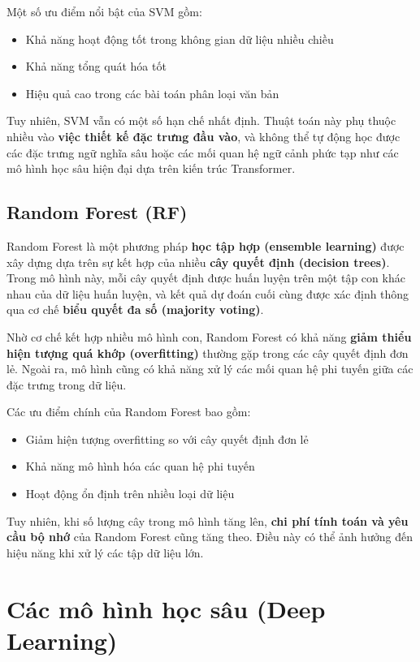 \documentclass[14pt, a4paper]{report}
\begin{document}
Một số ưu điểm nổi bật của SVM gồm:

\begin{itemize}
    \item Khả năng hoạt động tốt trong không gian dữ liệu nhiều chiều
    \item Khả năng tổng quát hóa tốt
    \item Hiệu quả cao trong các bài toán phân loại văn bản
\end{itemize}

Tuy nhiên, SVM vẫn có một số hạn chế nhất định. Thuật toán này phụ thuộc nhiều vào \textbf{việc thiết kế đặc trưng đầu vào}, và không thể tự động học được các đặc trưng ngữ nghĩa sâu hoặc các mối quan hệ ngữ cảnh phức tạp như các mô hình học sâu hiện đại dựa trên kiến trúc Transformer.

\subsection{Random Forest (RF)}

Random Forest là một phương pháp \textbf{học tập hợp (ensemble learning)} được xây dựng dựa trên sự kết hợp của nhiều \textbf{cây quyết định (decision trees)}. Trong mô hình này, mỗi cây quyết định được huấn luyện trên một tập con khác nhau của dữ liệu huấn luyện, và kết quả dự đoán cuối cùng được xác định thông qua cơ chế \textbf{biểu quyết đa số (majority voting)}.

Nhờ cơ chế kết hợp nhiều mô hình con, Random Forest có khả năng \textbf{giảm thiểu hiện tượng quá khớp (overfitting)} thường gặp trong các cây quyết định đơn lẻ. Ngoài ra, mô hình cũng có khả năng xử lý các mối quan hệ phi tuyến giữa các đặc trưng trong dữ liệu.

Các ưu điểm chính của Random Forest bao gồm:

\begin{itemize}
    \item Giảm hiện tượng overfitting so với cây quyết định đơn lẻ
    \item Khả năng mô hình hóa các quan hệ phi tuyến
    \item Hoạt động ổn định trên nhiều loại dữ liệu
\end{itemize}

Tuy nhiên, khi số lượng cây trong mô hình tăng lên, \textbf{chi phí tính toán và yêu cầu bộ nhớ} của Random Forest cũng tăng theo. Điều này có thể ảnh hưởng đến hiệu năng khi xử lý các tập dữ liệu lớn.

\section{Các mô hình học sâu (Deep Learning)}
\end{document}
